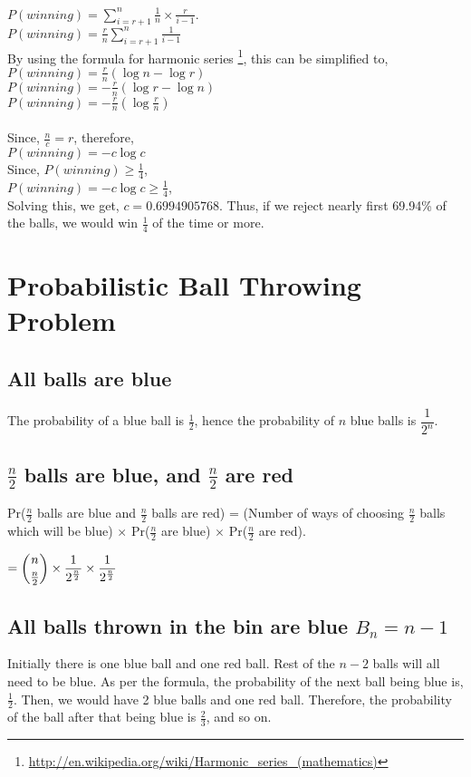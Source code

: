 \documentclass{article}
\begin{document}
\\
$P(winning) = \displaystyle\sum\limits_{i=r+1}^n \frac{1}{n} \times \frac{r}{i-1}$.\\
$P(winning) = \frac{r}{n} \displaystyle\sum\limits_{i=r+1}^n \frac{1}{i-1}$\\
By using the formula for harmonic series \footnote{\url{http://en.wikipedia.org/wiki/Harmonic_series_(mathematics)}}, 
this can be simplified to,\\
$P(winning) = \frac{r}{n} (\log{n} - \log{r})$\\
$P(winning) = -\frac{r}{n} (\log{r} - \log{n})$\\
$P(winning) = -\frac{r}{n}(\log{\frac{r}{n}})$\\
\\
Since, $\frac{n}{c} = r$, therefore,\\
$P(winning) = - c \log{c}$\\
Since, $P(winning) \geq \frac{1}{4}$,\\
$P(winning) = - c \log{c} \geq \frac{1}{4}$,\\
Solving this, we get, $c = 0.6994905768$. Thus, if we reject nearly first 69.94\% of the balls,
we would win $\frac{1}{4}$ of the time or more.
\clearpage

\section{Probabilistic Ball Throwing Problem}
\subsection{All balls are blue}
The probability of a blue ball is $\frac{1}{2}$, hence the probability of
$n$ blue balls is $\dfrac{1}{2^n}$.

\subsection{$\frac{n}{2}$ balls are blue, and $\frac{n}{2}$ are red}
Pr($\frac{n}{2}$ balls are blue and $\frac{n}{2}$ balls are red) = (Number of ways of choosing $\frac{n}{2}$
balls which will be blue) $\times$ Pr($\frac{n}{2}$ are blue) $\times$
Pr($\frac{n}{2}$ are red).

$= \dbinom{n}{\frac{n}{2}} \times \dfrac{1}{2^{\frac{n}{2}}} \times \dfrac{1}{2^{\frac{n}{2}}}  $ \\

\subsection{All balls thrown in the bin are blue $B_{n} = n-1$}
Initially there is one blue ball and one red ball. Rest of the $n-2$ balls will
all need to be blue. As per the formula, the probability of the next ball 
being blue is, $\frac{1}{2}$. Then, we would have 2 blue balls and one red ball.
Therefore, the probability of the ball after that being blue is $\frac{2}{3}$,
and so on.
\end{document}
